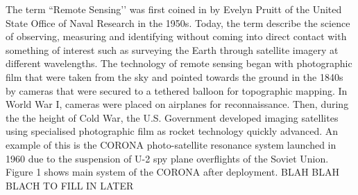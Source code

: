 


The term ``Remote Sensing’’ was first coined in by Evelyn Pruitt of the United State Office of Naval Research in the 1950s. Today, the term describe the science of observing, measuring and identifying without coming into direct contact with something of interest such as surveying the Earth through satellite imagery at different wavelengths. The technology of remote sensing began with photographic film that were taken from the sky and pointed towards the ground in the 1840s by cameras that were secured to a tethered balloon for topographic mapping. In World War I, cameras were placed on airplanes for reconnaissance. Then, during the the height of Cold War, the U.S. Government developed imaging satellites using specialised photographic film as rocket technology quickly advanced. An example of this is the CORONA photo-satellite resonance system launched in 1960 due to the suspension of U-2 spy plane overflights of the Soviet Union. Figure 1 shows main system of the CORONA after deployment. 
BLAH BLAH BLACH TO  FILL IN LATER